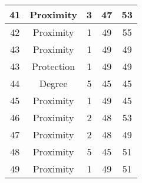 \documentclass[results.tex]{subfiles}
\begin{document}
\begin{center}
\begin{tabular}{| c || c | c | c | c |}
            \hline
            41                      & Proximity                    & 3                      & 47                      & 53                   \\
            \hline
            42                      & Proximity                    & 1                      & 49                      & 55                   \\
            \hline
            43                      & Proximity                    & 1                      & 49                      & 49                   \\
            \hline
            43                      & Protection                   & 1                      & 49                      & 49                   \\
            \hline
            44                      & Degree                       & 5                      & 45                      & 45                   \\
            \hline
            45                      & Proximity                    & 1                      & 49                      & 45                   \\
            \hline
            46                      & Proximity                    & 2                      & 48                      & 53                   \\
            \hline
            47                      & Proximity                    & 2                      & 48                      & 49                   \\
            \hline
            48                      & Proximity                    & 5                      & 45                      & 51                   \\
            \hline
            49                      & Proximity                    & 1                      & 49                      & 51                   \\
            \hline
        \end{tabular}
    \end{center}
\end{document}
